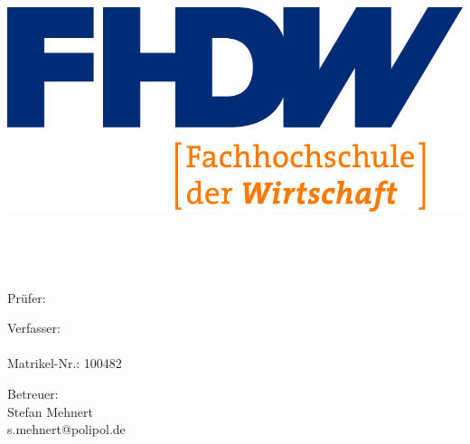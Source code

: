 
\begin{titlepage}

    \begin{center}


        \includegraphics[scale=1.20]{img/fhdw}\\

        \vspace{.5cm}

        \Huge{\bfseries\dokumententyp}

        ~\vspace{.2cm}\\

        \LARGE{\dokumententitel}

        ~\vspace{.2cm}\\


        \large{

            Prüfer:\\\vspace{1mm}

            \dokumentenpruefer

            \vspace{.5cm}

            Verfasser:\vspace{1mm}\\

            \dokumentenautor\\
            Matrikel-Nr.: 100482\\

            \dokumentenautoradress

            \vspace{.3cm}

            Betreuer:\\\vspace{1mm}
            Stefan Mehnert\\
            s.mehnert@polipol.de

}
\end{center}
\end{titlepage}
